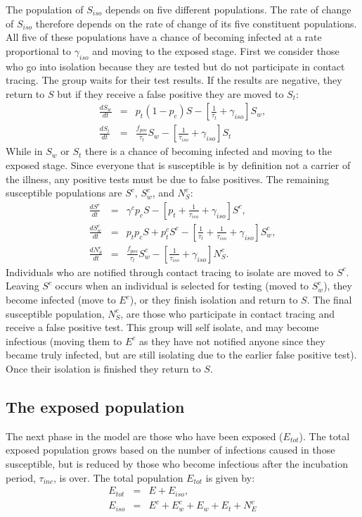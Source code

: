 \documentclass[notitlepage, superscriptaddress]{revtex4-2}
\begin{document}
The population of $S_{iso}$ depends on five different populations. The rate of change of $S_{iso}$ therefore depends on the rate of change of its five constituent populations. All five of these populations have a chance of becoming infected at a rate proportional to $\gamma_{iso}$ and moving to the exposed stage. First we consider those who go into isolation because they are tested but do not participate in contact tracing. The group waits for their test results. If the results are negative, they return to $S$ but if they receive a false positive they are moved to $S_{t}$:
\begin{eqnarray}
\label{E:dS_iso}
\frac{dS_{w}}{dt} &=& p_{t} (1 -p_{c}) S - [\frac{1}{\tau_{t}}  + \gamma_{iso}] S_{w}, \\
%
\frac{dS_{t}}{dt} &=& \frac{f_{pos}}{\tau_{t}} S_{w} - [\frac{1}{\tau_{iso}}  + \gamma_{iso}] S_{t}
\end{eqnarray}
While in $S_{w}$ or $S_{t}$ there is a chance of becoming infected and moving to the exposed stage. Since everyone that is susceptible is by definition not a carrier of the illness, any positive tests must be due to false positives. The remaining susceptible populations are $S^{c}$, $S^{c}_{w}$, and $N^{c}_{S}$:
\begin{eqnarray}
\label{E:dSc}
 \frac{dS^{c}}{dt} &=& \gamma^{c} p_{c} S -[p_{t} +\frac{1}{\tau_{iso}} +\gamma_{iso}] S^{c}, \\
 \frac{dS^{c}_{w}}{dt} &=& p_{t}p_{c} S + p^{c}_{t} S^{c} - [\frac{1}{\tau_{t}}  + \frac{1}{\tau_{iso}}  + \gamma_{iso}] S^{c}_{w}, \\ 
 \frac{dN^{c}_{S}}{dt} &=& \frac{f_{pos}}{\tau_{t}} S^{c}_{w} - [\frac{1}{\tau_{iso}}  + \gamma_{iso}] N^{c}_{S}.  
\end{eqnarray}
Individuals who are notified through contact tracing to isolate are moved to $S^{c}$. Leaving $S^{c}$ occurs when an individual is selected for testing (moved to $S^{c}_{w}$), they become infected (move to $E^{c}$), or they finish isolation and return to $S$. The final susceptible population, $N^{c}_{S}$, are those who participate in contact tracing and receive a false positive test. This group will self isolate, and may become infectious (moving them to $E^{c}$ as they have not notified anyone since they became truly infected, but are still isolating due to the earlier false positive test). Once their isolation is finished they return to $S$.

\subsection{The exposed population}
The next phase in the model are those who have been exposed ($E_{tot}$). The total exposed population grows based on the number of infections caused in those susceptible, but is reduced by those who become infectious after the incubation period, $\tau_{inc}$, is over. The total population $E_{tot}$ is given by:
\begin{eqnarray}
\label{E:Etot}
E_{tot} &=& E + E_{iso}, \\ 
%
E_{iso} &=& E^{c} + E^{c}_{w} + E_{w} + E_{t} + N^{c}_{E}
\end{eqnarray}
\end{document}
